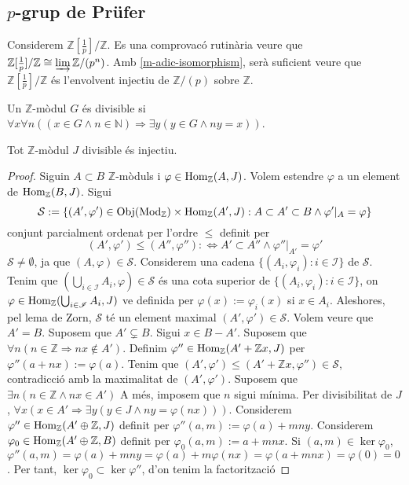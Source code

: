 \subsection{$p$-grup de Prüfer}
Considerem $\mathbb{Z}[\frac{1}{p}]/\mathbb{Z}$. Es una comprovacó rutinària veure que $\mathbb{Z}[\frac{1}{p}]/\mathbb{Z}\cong\varinjlim\mathbb{Z}/(p^{n})$. Amb \ref{m-adic-isomorphism}, serà suficient veure que $\mathbb{Z}[\frac{1}{p}]/\mathbb{Z}$ és l'envolvent injectiu de $\mathbb{Z}/(p)$ sobre $\mathbb{Z}$.
\begin{definicio}
    Un $\mathbb{Z}$-mòdul $G$ és divisible si $\forall x\forall n((x\in G\land n\in\mathbb{N})\Rightarrow\exists y(y\in G\land ny=x))$.
\end{definicio}
\begin{proposicio}\label{divisible-implica-injectiu}
    Tot $\mathbb{Z}$-mòdul $J$ divisible és injectiu.
    \begin{proof}
        Siguin $A\subset B$ $\mathbb{Z}$-mòduls i $\varphi\in\operatorname{Hom}_{\mathbb{Z}}(A,J)$. Volem estendre $\varphi$ a un element de $\operatorname{Hom}_{\mathbb{Z}}(B,J)$. Sigui
        \begin{equation*}
            \mathcal{S}:=\{(A',\varphi')\in\operatorname{Obj}(\textrm{Mod}_{\mathbb{Z}})\times\operatorname{Hom}_{\mathbb{Z}}(A',J):A\subset A'\subset B\land\varphi'|_{A}=\varphi\}
        \end{equation*}
        conjunt parcialment ordenat per l'ordre $\leq$ definit per
        \begin{equation*}
            (A',\varphi')\leq(A'',\varphi''):\iff A'\subset A''\land\varphi''|_{A'}=\varphi'
        \end{equation*} $\mathcal{S}\neq\emptyset$, ja que $(A,\varphi)\in\mathcal{S}$. Considerem una cadena $\{(A_{i},\varphi_{i}):i\in\mathscr{I}\}$ de $\mathcal{S}$. Tenim que $(\bigcup_{i\in\mathscr{I}}A_{i},\varphi)\in\mathcal{S}$ és una cota superior de $\{(A_{i},\varphi_{i}):i\in\mathscr{I}\}$, on $\varphi\in\operatorname{Hom}_{\mathbb{Z}}(\bigcup_{i\in\mathscr{I}}A_{i},J)$ ve definida per $\varphi(x):=\varphi_{i}(x)$ si $x\in A_{i}$. Aleshores, pel lema de Zorn, $\mathcal{S}$ té un element maximal $(A',\varphi')\in\mathcal{S}$.\newline
        Volem veure que $A'=B$. Suposem que $A'\subsetneq B$. Sigui $x\in B-A'$. Suposem que $\forall n(n\in\mathbb{Z}\Rightarrow nx\notin A')$. Definim $\varphi''\in\operatorname{Hom}_{\mathbb{Z}}(A'+\mathbb{Z}x,J)$ per $\varphi''(a+nx):=\varphi(a)$. Tenim que $(A',\varphi')\leq(A'+\mathbb{Z}x,\varphi'')\in\mathcal{S}$, contradicció amb la maximalitat de $(A',\varphi')$. Suposem que $\exists n(n\in\mathbb{Z}\land nx\in A')$ A més, imposem que $n$ sigui mínima. Per divisibilitat de $J$, $\forall x(x\in A'\Rightarrow\exists y(y\in J\land ny=\varphi(nx)))$. Considerem $\varphi''\in\operatorname{Hom}_{\mathbb{Z}}(A'\oplus\mathbb{Z},J)$ definit per $\varphi''(a,m):=\varphi(a)+mny$. Considerem $\varphi_{0}\in\operatorname{Hom}_{\mathbb{Z}}(A'\oplus\mathbb{Z},B)$ definit per $\varphi_{0}(a,m):=a+mnx$. Si $(a,m)\in\ker{\varphi_{0}}$, $\varphi''(a,m)=\varphi(a)+mny=\varphi(a)+m\varphi(nx)=\varphi(a+mnx)=\varphi(0)=0$. Per tant, $\ker{\varphi_{0}}\subset\ker{\varphi''}$, d'on tenim la factorització

\end{proof}
\end{proposicio}
